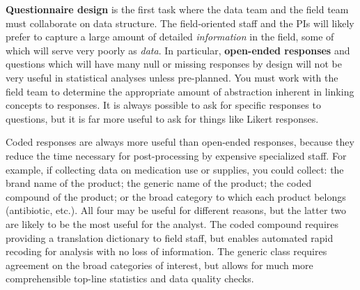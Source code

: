 \textbf{Questionnaire design}
is the first task where the data team
and the field team must collaborate on data structure.
The field-oriented staff and the PIs will likely prefer
to capture a large amount of detailed \textit{information}
in the field, some of which will serve very poorly as \textit{data}.
In particular, \textbf{open-ended responses} and questions which will have
many null or missing responses by design will not be very useful
in statistical analyses unless pre-planned.
You must work with the field team to determine the appropriate amount
of abstraction inherent in linking concepts to responses.
It is always possible to ask for specific responses to questions,
but it is far more useful to ask for things like Likert responses.

Coded responses are always more useful than open-ended responses,
because they reduce the time necessary for post-processing by
expensive specialized staff.
For example, if collecting data on medication use or supplies,
you could collect: the brand name of the product;
the generic name of the product;
the coded compound of the product;
or the broad category to which each product belongs (antibiotic, etc.).
All four may be useful for different reasons,
but the latter two are likely to be the most useful for the analyst.
The coded compound requires providing a translation dictionary
to field staff, but enables automated rapid recoding for analysis
with no loss of information.
The generic class requires agreement on the broad categories of interest,
but allows for much more comprehensible top-line statistics and data quality checks.

